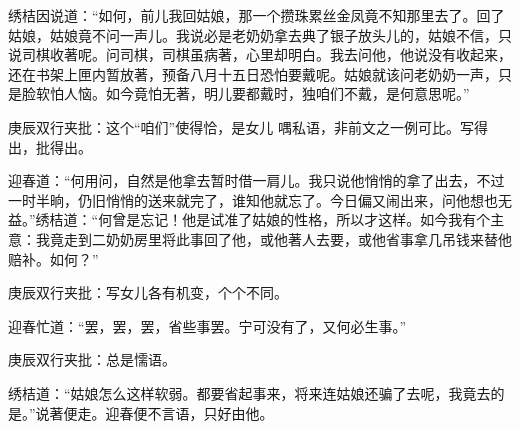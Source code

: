 \begin{parag}
    绣桔因说道：“如何，前儿我回姑娘，那一个攒珠累丝金凤竟不知那里去了。回了姑娘，姑娘竟不问一声儿。我说必是老奶奶拿去典了银子放头儿的，姑娘不信，只说司棋收著呢。问司棋，司棋虽病著，心里却明白。我去问他，他说没有收起来，还在书架上匣内暂放著，预备八月十五日恐怕要戴呢。姑娘就该问老奶奶一声，只是脸软怕人恼。如今竟怕无著，明儿要都戴时，独咱们不戴，是何意思呢。”\begin{note}庚辰双行夹批：这个“咱们”使得恰，是女儿 喁私语，非前文之一例可比。写得出，批得出。\end{note}迎春道：“何用问，自然是他拿去暂时借一肩儿。我只说他悄悄的拿了出去，不过一时半晌，仍旧悄悄的送来就完了，谁知他就忘了。今日偏又闹出来，问他想也无益。”绣桔道：“何曾是忘记！他是试准了姑娘的性格，所以才这样。如今我有个主意：我竟走到二奶奶房里将此事回了他，或他著人去要，或他省事拿几吊钱来替他赔补。如何？”\begin{note}庚辰双行夹批：写女儿各有机变，个个不同。\end{note}迎春忙道：“罢，罢，罢，省些事罢。宁可没有了，又何必生事。”\begin{note}庚辰双行夹批：总是懦语。\end{note}绣桔道：“姑娘怎么这样软弱。都要省起事来，将来连姑娘还骗了去呢，我竟去的是。”说著便走。迎春便不言语，只好由他。
\end{parag}


